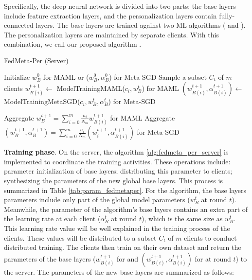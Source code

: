 \documentclass[runningheads]{llncs}
\begin{document}
Specifically, the deep neural network is divided into two parts: the base layers include feature extraction layers, and the personalization layers contain fully-connected layers. The base layers are trained against two ML algorithms ( and ). The personalization layers are maintained by separate clients. With this combination, we call our proposed algorithm .

\begin{algorithm}[h]
    \caption{FedMeta-Per (Server)} \label{alg:fedmeta_per_server}
    \begin{algorithmic}[1]
        \State Initialize $w_B^0$ for MAML or ($w_B^0, \alpha_B^0$) for Meta-SGD
            \State Sample a subset $C_t$ of $m$ clients
                \State $w_{B(i)}^{t+1} \gets$ ModelTrainingMAML($c_i, w_B^t$) for MAML
                \State $(w_{B(i)}^{t+1}, \alpha_{B(i)}^{t+1}) \gets$ ModelTrainingMetaSGD($c_i, w_B^t, \alpha_B^t$) for Meta-SGD
            \EndFor

            \State
            \State Aggregate $w_{B}^{t+1} = \sum_{i=0}^m \frac{n_i}{N_m} w_{B(i)}^{t+1}$ for MAML
            \State Aggregate $(w_B^{t+1}, \alpha_B^{t+1}) = \sum_{i=0}^m \frac{n_i}{N_m} (w_i^{t+1}, \alpha_{B(i)}^{t+1})$ for Meta-SGD
        \EndFor
    \end{algorithmic}
\end{algorithm}

\textbf{Training phase}. On the server, the algorithm \ref{alg:fedmeta_per_server} is implemented to coordinate the training activities. These operations include: parameter initialization of base layers; distributing this parameter to clients; synthesizing the parameters of the new global base layers. This process is summarized in Table \ref{tab:param_fedmetaper}. For the  algorithm, the base layers parameters include only part of the global model parameters ($w_B^t$ at round $t$). Meanwhile, the parameter of the  algorithm's base layers contains an extra part of the learning rate at each client ($\alpha_B^t$ at round $t$), which is the same size as $w_B^t$. This learning rate value will be well explained in the training process of the clients. These values will be distributed to a subset $C_t$ of $m$ clients to conduct distributed training. The clients then train on their own dataset and return the parameters of the base layers ($w_{B(i)}^{t+1}$ for  and $( w_{B(i)}^{t+1}, \alpha_{B(i)}^{t+1})$ for  at round $t$) to the server. The parameters of the new base layers are summarized as follows:
\end{document}
